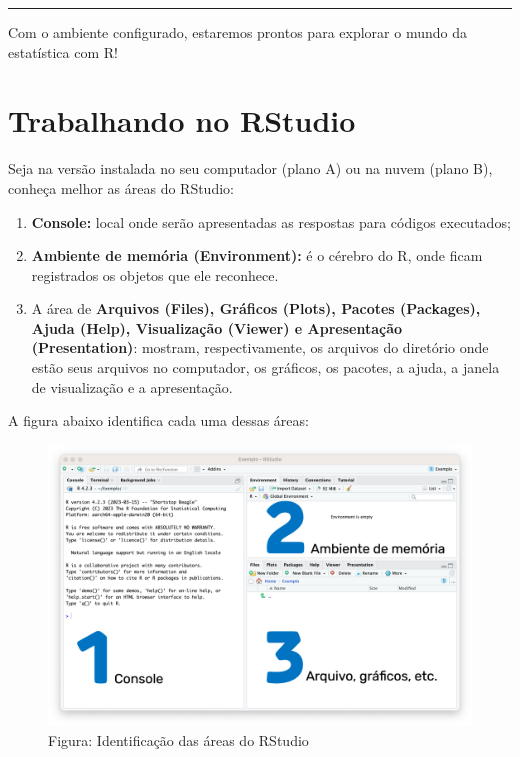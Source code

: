 \documentclass[
]{book}
\begin{document}
\begin{center}\rule{0.5\linewidth}{0.5pt}\end{center}

Com o ambiente configurado, estaremos prontos para explorar o mundo da estatística com R!

\chapter{Trabalhando no RStudio}\label{trabalhando-RStudio}

Seja na versão instalada no seu computador (plano A) ou na nuvem (plano B), conheça melhor as áreas do RStudio:

\begin{enumerate}
\def\labelenumi{\arabic{enumi}.}
\item
  \textbf{Console:} local onde serão apresentadas as respostas para códigos executados;
\item
  \textbf{Ambiente de memória (Environment):} é o cérebro do R, onde ficam registrados os objetos que ele reconhece.
\item
  A área de \textbf{Arquivos (Files), Gráficos (Plots), Pacotes (Packages), Ajuda (Help), Visualização (Viewer) e Apresentação (Presentation)}: mostram, respectivamente, os arquivos do diretório onde estão seus arquivos no computador, os gráficos, os pacotes, a ajuda, a janela de visualização e a apresentação.
\end{enumerate}

A figura abaixo identifica cada uma dessas áreas:

\begin{figure}
\centering
\includegraphics{telaRStudio123.png}
\caption{Figura: Identificação das áreas do RStudio}
\end{figure}
\end{document}
